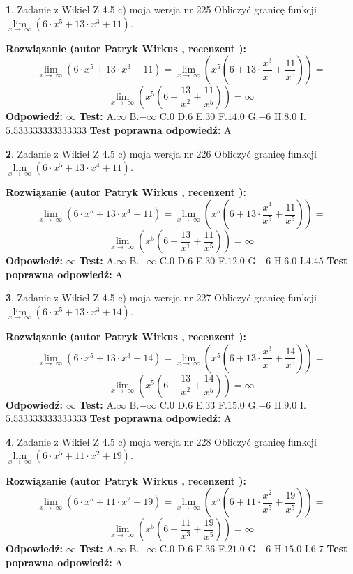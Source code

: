 \documentclass[12pt, a4paper]{article}
\theoremstyle{definition} %
\newtheorem{zad}{}
\newcommand{\zadStart}[1]{\begin{zad}#1\newline}
\newcommand{\zadStop}{\end{zad}}
\newcommand{\rozwStart}[2]{\noindent \textbf{Rozwiązanie (autor #1 , recenzent #2): }\newline}
\newcommand{\rozwStop}{\newline}
\newcommand{\odpStart}{\noindent \textbf{Odpowiedź:}\newline}
\newcommand{\odpStop}{\newline}
\newcommand{\testStart}{\noindent \textbf{Test:}\newline}
\newcommand{\testStop}{\newline}
\newcommand{\kluczStart}{\noindent \textbf{Test poprawna odpowiedź:}\newline}
\newcommand{\kluczStop}{\newline}
\begin{document}
\zadStart{Zadanie z Wikieł Z 4.5 c) moja wersja nr 225}
Obliczyć granicę funkcji  $\lim\limits_{x\to\ \infty}(6 \cdot x^{5}+13 \cdot x^{3}+11)$.
\zadStop
\rozwStart{Patryk Wirkus}{}
$$\lim\limits_{x\to\ \infty}(6 \cdot x^{5}+13 \cdot x^{3}+11) = \lim\limits_{x\to\ \infty}(x^{5}(6 +13 \cdot \frac{x^{3}}{x^{5}}+\frac{11}{x^{5}})) =$$ $$\lim\limits_{x\to\ \infty}(x^{5}(6 +\frac{13}{x^{2}}+\frac{11}{x^{5}})) =\infty$$
\rozwStop
\odpStart
$\infty$
\odpStop
\testStart
A.$\infty$ B.$-\infty$ C.$0$ D.$6$ E.$30$
F.$14.0$ G.$-6$
H.$8.0$
I.$5.533333333333333$
\testStop
\kluczStart
A
\kluczStop



\zadStart{Zadanie z Wikieł Z 4.5 c) moja wersja nr 226}
Obliczyć granicę funkcji  $\lim\limits_{x\to\ \infty}(6 \cdot x^{5}+13 \cdot x^{4}+11)$.
\zadStop
\rozwStart{Patryk Wirkus}{}
$$\lim\limits_{x\to\ \infty}(6 \cdot x^{5}+13 \cdot x^{4}+11) = \lim\limits_{x\to\ \infty}(x^{5}(6 +13 \cdot \frac{x^{4}}{x^{5}}+\frac{11}{x^{5}})) =$$ $$\lim\limits_{x\to\ \infty}(x^{5}(6 +\frac{13}{x^{1}}+\frac{11}{x^{5}})) =\infty$$
\rozwStop
\odpStart
$\infty$
\odpStop
\testStart
A.$\infty$ B.$-\infty$ C.$0$ D.$6$ E.$30$
F.$12.0$ G.$-6$
H.$6.0$
I.$4.45$
\testStop
\kluczStart
A
\kluczStop



\zadStart{Zadanie z Wikieł Z 4.5 c) moja wersja nr 227}
Obliczyć granicę funkcji  $\lim\limits_{x\to\ \infty}(6 \cdot x^{5}+13 \cdot x^{3}+14)$.
\zadStop
\rozwStart{Patryk Wirkus}{}
$$\lim\limits_{x\to\ \infty}(6 \cdot x^{5}+13 \cdot x^{3}+14) = \lim\limits_{x\to\ \infty}(x^{5}(6 +13 \cdot \frac{x^{3}}{x^{5}}+\frac{14}{x^{5}})) =$$ $$\lim\limits_{x\to\ \infty}(x^{5}(6 +\frac{13}{x^{2}}+\frac{14}{x^{5}})) =\infty$$
\rozwStop
\odpStart
$\infty$
\odpStop
\testStart
A.$\infty$ B.$-\infty$ C.$0$ D.$6$ E.$33$
F.$15.0$ G.$-6$
H.$9.0$
I.$5.533333333333333$
\testStop
\kluczStart
A
\kluczStop



\zadStart{Zadanie z Wikieł Z 4.5 c) moja wersja nr 228}
Obliczyć granicę funkcji  $\lim\limits_{x\to\ \infty}(6 \cdot x^{5}+11 \cdot x^{2}+19)$.
\zadStop
\rozwStart{Patryk Wirkus}{}
$$\lim\limits_{x\to\ \infty}(6 \cdot x^{5}+11 \cdot x^{2}+19) = \lim\limits_{x\to\ \infty}(x^{5}(6 +11 \cdot \frac{x^{2}}{x^{5}}+\frac{19}{x^{5}})) =$$ $$\lim\limits_{x\to\ \infty}(x^{5}(6 +\frac{11}{x^{3}}+\frac{19}{x^{5}})) =\infty$$
\rozwStop
\odpStart
$\infty$
\odpStop
\testStart
A.$\infty$ B.$-\infty$ C.$0$ D.$6$ E.$36$
F.$21.0$ G.$-6$
H.$15.0$
I.$6.7$
\testStop
\kluczStart
A
\kluczStop
\end{document}

